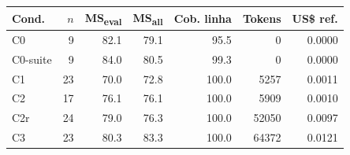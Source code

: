 \begin{tabular}{lrrrrrr}
\toprule
Cond. & $n$ & MS\textsubscript{eval} & MS\textsubscript{all} & Cob. linha & Tokens & US\$ ref. \\
\midrule
C0 & 9 & 82.1 & 79.1 & 95.5 & 0 & 0.0000 \\
C0-suite & 9 & 84.0 & 80.5 & 99.3 & 0 & 0.0000 \\
C1 & 23 & 70.0 & 72.8 & 100.0 & 5257 & 0.0011 \\
C2 & 17 & 76.1 & 76.1 & 100.0 & 5909 & 0.0010 \\
C2r & 24 & 79.0 & 76.3 & 100.0 & 52050 & 0.0097 \\
C3 & 23 & 80.3 & 83.3 & 100.0 & 64372 & 0.0121 \\
\bottomrule
\end{tabular}
